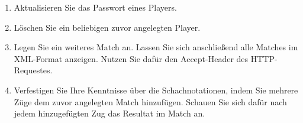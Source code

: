 \begin{enumerate}
	\item Aktualisieren Sie das Passwort eines Players.
	\item Löschen Sie ein beliebigen zuvor angelegten Player.
	\item Legen Sie ein weiteres Match an. Lassen Sie sich anschließend alle Matches im \gls{XML}-Format anzeigen. Nutzen Sie dafür den Accept-Header des \gls{HTTP}-Requestes.
	\item Verfestigen Sie Ihre Kenntnisse über die Schachnotationen, indem Sie mehrere Züge dem zuvor angelegten Match hinzufügen. Schauen Sie sich dafür nach jedem hinzugefügten Zug das Resultat im Match an.
\end{enumerate}